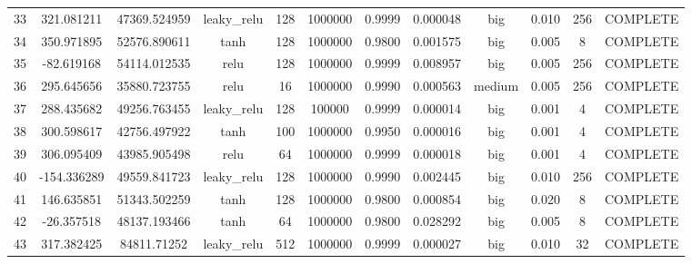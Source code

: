\begin{longtable}{cccccccccccc}
                       33 &                 321.081211 &                       47369.524959 &     leaky\_relu &         128 &      1000000 & 0.9999 &       0.000048 &       big & 0.010 &         256 & COMPLETE \\
                       34 &                 350.971895 &                       52576.890611 &            tanh &         128 &      1000000 & 0.9800 &       0.001575 &       big & 0.005 &           8 & COMPLETE \\
                       35 &                 -82.619168 &                       54114.012535 &            relu &         128 &      1000000 & 0.9999 &       0.008957 &       big & 0.005 &         256 & COMPLETE \\
                       36 &                 295.645656 &                       35880.723755 &            relu &          16 &      1000000 & 0.9990 &       0.000563 &    medium & 0.005 &         256 & COMPLETE \\
                       37 &                 288.435682 &                       49256.763455 &     leaky\_relu &         128 &       100000 & 0.9999 &       0.000014 &       big & 0.001 &           4 & COMPLETE \\
                       38 &                 300.598617 &                       42756.497922 &            tanh &         100 &      1000000 & 0.9950 &       0.000016 &       big & 0.001 &           4 & COMPLETE \\
                       39 &                 306.095409 &                       43985.905498 &            relu &          64 &      1000000 & 0.9999 &       0.000018 &       big & 0.001 &           4 & COMPLETE \\
                       40 &                -154.336289 &                       49559.841723 &     leaky\_relu &         128 &      1000000 & 0.9990 &       0.002445 &       big & 0.010 &         256 & COMPLETE \\
                       41 &                 146.635851 &                       51343.502259 &            tanh &         128 &      1000000 & 0.9800 &       0.000854 &       big & 0.020 &           8 & COMPLETE \\
                       42 &                 -26.357518 &                       48137.193466 &            tanh &          64 &      1000000 & 0.9800 &       0.028292 &       big & 0.005 &           8 & COMPLETE \\
                       43 &                 317.382425 &                        84811.71252 &     leaky\_relu &         512 &      1000000 & 0.9999 &       0.000027 &       big & 0.010 &          32 & COMPLETE \\

\end{longtable}
